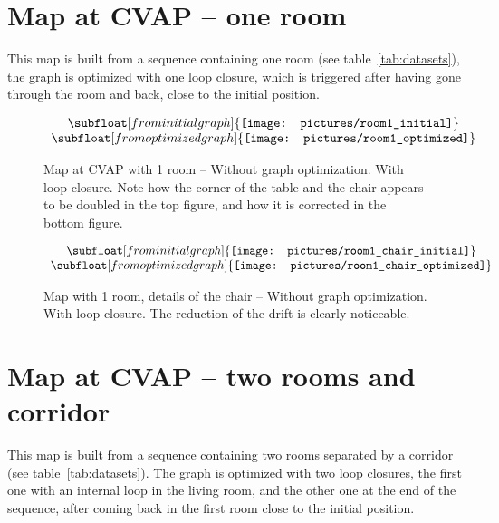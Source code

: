 
\cleardoublepage
\section{Map at CVAP -- one room}

This map is built from a sequence containing one room (see table~\ref{tab:datasets}), the graph is optimized with one loop closure, which is triggered after having gone through the room and back, close to the initial position. 

\begin{figure}[H]
\centering$
\begin{array}{c}
\subfloat[from initial graph]{\label{fig:room1_1}\texttt{[image: pictures/room1\_initial]}} \\
\subfloat[from optimized graph]{\label{fig:room1_2}\texttt{[image: pictures/room1\_optimized]}}
\end{array}$
\caption{Map at CVAP with 1 room -- \protect{} Without graph optimization. \protect{} With loop closure. Note how the corner of the table and the chair appears to be doubled in the top figure, and how it is corrected in the bottom figure.}
\end{figure}

\begin{figure}[H]
\centering$
\begin{array}{c}
\subfloat[from initial graph]{\label{fig:room1_chair_1}\texttt{[image: pictures/room1\_chair\_initial]}} \\
\subfloat[from optimized graph]{\label{fig:room1_chair_2}\texttt{[image: pictures/room1\_chair\_optimized]}}
\end{array}$
\caption{Map with 1 room, details of the chair -- \protect{} Without graph optimization. \protect{} With loop closure. The reduction of the drift is clearly noticeable.}
\end{figure}

\clearpage
\section{Map at CVAP -- two rooms and corridor}

This map is built from a sequence containing two rooms separated by a corridor (see table~\ref{tab:datasets}). The graph is optimized with two loop closures, the first one with an internal loop in the living room, and the other one at the end of the sequence, after coming back in the first room close to the initial position. 

